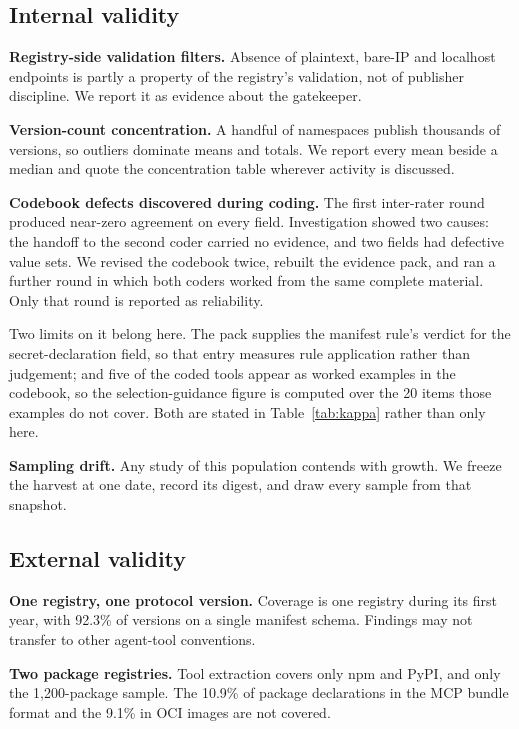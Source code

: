 \documentclass[a4paper,fleqn]{cas-dc}
\begin{document}
\subsection{Internal validity}

\textbf{Registry-side validation filters.} Absence of plaintext, bare-IP and
localhost endpoints is partly a property of the registry's validation, not
of publisher discipline. We report it as evidence about the gatekeeper.

\textbf{Version-count concentration.} A handful of namespaces publish thousands
of versions, so outliers dominate means and totals. We report every mean beside
a median and quote the concentration table wherever activity is discussed.

\textbf{Codebook defects discovered during coding.} The first inter-rater round
produced near-zero agreement on every field. Investigation showed two causes:
the handoff to the second coder carried no evidence, and two fields had
defective value sets. We revised the codebook twice, rebuilt the evidence pack,
and ran a further round in which both coders worked from the same complete
material. Only that round is reported as reliability.

Two limits on it belong here. The pack supplies the manifest rule's verdict for
the secret-declaration field, so that entry measures rule application rather
than judgement; and five of the coded tools appear as worked examples in the
codebook, so the selection-guidance figure is computed over the 20 items those
examples do not cover. Both are stated in Table~\ref{tab:kappa} rather than
only here.

\textbf{Sampling drift.} Any study of this population contends with growth. We freeze
the harvest at one date, record its digest, and draw every sample from that
snapshot.

\subsection{External validity}

\textbf{One registry, one protocol version.} Coverage is one registry during
its first year, with 92.3\% of versions on a single manifest schema.
Findings may not transfer to other agent-tool conventions.

\textbf{Two package registries.} Tool extraction covers only npm and PyPI, and
only the 1,200-package sample. The 10.9\% of package declarations in the MCP
bundle format and the 9.1\% in OCI images are not covered.
\end{document}
